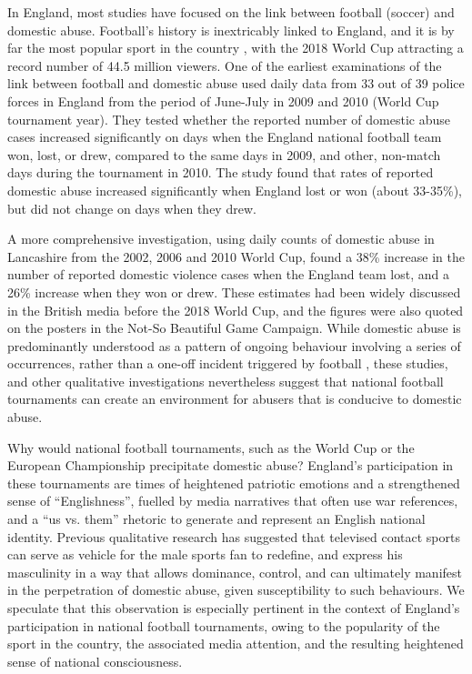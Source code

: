 \documentclass[12pt, letterpaper]{article}
\begin{document}
In England, most studies have focused on the link between football (soccer) and domestic abuse. Football's history is inextricably linked to England, and it is by far the most popular sport in the country \autocite{Parry2014}, with the 2018 World Cup attracting a record number of 44.5 million viewers\autocite{BBC}. One of the earliest examinations of the link between football and domestic abuse used daily data from 33 out of 39 police forces in England from the period of June-July in 2009 and 2010 (World Cup tournament year)\autocite{Brimicombe2012}. They tested whether the reported number of domestic abuse cases increased significantly on days when the England national football team won, lost, or drew, compared to the same days in 2009, and other, non-match days during the tournament in 2010. The study found that rates of reported domestic abuse increased significantly when England lost or won (about 33-35\%), but did not change on days when they drew. 

A more comprehensive investigation, using daily counts of domestic abuse in Lancashire from the 2002, 2006 and 2010 World Cup, found a 38\% increase in the number of reported domestic violence cases when the England team lost, and a 26\% increase when they won or drew\autocite{Kirby2014}. These estimates had been widely discussed in the British media before the 2018 World Cup, and the figures were also quoted on the posters in the Not-So Beautiful Game Campaign. While domestic abuse is predominantly understood as a pattern of ongoing behaviour involving a series of occurrences, rather than a one-off incident triggered by football \autocite{Brooks-Hay2018}, these studies, and other qualitative investigations\autocite{Swallow} nevertheless suggest that national football tournaments can create an environment for abusers that is conducive to domestic abuse.

Why would national football tournaments, such as the World Cup or the European Championship precipitate domestic abuse? England's participation in these tournaments are times of heightened patriotic emotions and a strengthened sense of ``Englishness'', fuelled by media narratives that often use war references, and a ``us vs. them'' rhetoric to generate and represent an English national identity\autocite{Vincent2014}. Previous qualitative research has suggested that televised contact sports can serve as vehicle for the male sports fan to redefine, and express his masculinity in a way that allows dominance, control, and can ultimately manifest in the perpetration of domestic abuse\autocite{Sabo,Swallow}, given susceptibility to such behaviours. We speculate that this observation is especially pertinent in the context of England's participation in national football tournaments, owing to the popularity of the sport in the country, the associated media attention, and the resulting heightened sense of national consciousness.
\end{document}
